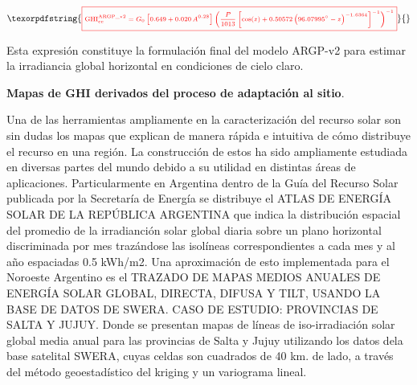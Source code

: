 \documentclass[letterpaper,12pt, twoside]{report}
\makeatletter
\let\newtitle\@title
\providecommand{\DIFdeltex}[1]{{\protect\color{red} \scriptsize #1}} %
\providecommand{\DIFaddbegin}{} %
\providecommand{\DIFaddend}{} %
\providecommand{\DIFdelbegin}{} %
\providecommand{\DIFdelend}{} %
\providecommand{\DIFdel}[1]{\texorpdfstring{\DIFdeltex{#1}}{}} %
\newcommand{\DIFscaledelfig}{0.5}
\newlength{\DIFdelgraphicswidth} %
\newlength{\DIFdelgraphicsheight} %
\newcommand{\DIFaddincludegraphics}[2][]{{\color{blue}\fbox{\DIFOincludegraphics[#1]{#2}}}} %
\newcommand{\DIFdelincludegraphics}[2][]{%
\sbox{\DIFdelgraphicsbox}{\DIFOincludegraphics[#1]{#2}}%
\settoboxwidth{\DIFdelgraphicswidth}{\DIFdelgraphicsbox} %
\settoboxtotalheight{\DIFdelgraphicsheight}{\DIFdelgraphicsbox} %
\scalebox{\DIFscaledelfig}{%
\parbox[b]{\DIFdelgraphicswidth}{\usebox{\DIFdelgraphicsbox}\\[-\baselineskip] \rule{\DIFdelgraphicswidth}{0em}}\llap{\resizebox{\DIFdelgraphicswidth}{\DIFdelgraphicsheight}{%
\setlength{\unitlength}{\DIFdelgraphicswidth}%
\begin{picture}(1,1)%
\thicklines\linethickness{2pt} %
{\color[rgb]{1,0,0}\put(0,0){\framebox(1,1){}}}%
{\color[rgb]{1,0,0}\put(0,0){\line( 1,1){1}}}%
{\color[rgb]{1,0,0}\put(0,1){\line(1,-1){1}}}%
\end{picture}%
}\hspace*{3pt}}} %
} %
\DeclareRobustCommand{\DIFaddbegin}{\DIFOaddbegin \let\includegraphics\DIFaddincludegraphics} %
\DeclareRobustCommand{\DIFaddend}{\DIFOaddend \let\includegraphics\DIFOincludegraphics} %
\DeclareRobustCommand{\DIFdelbegin}{\DIFOdelbegin \let\includegraphics\DIFdelincludegraphics} %
\DeclareRobustCommand{\DIFdelend}{\DIFOaddend \let\includegraphics\DIFOincludegraphics} %
\makeatother
\begin{document}
\begin{displaymath}
\DIFdel{\boxed{
\mathrm{GHI_{cc}^{ARGP\_v2}} =
G_0 \left[ 0.649 + 0.020\, A^{0.28} \right]
\left(
\frac{P}{1013}
\left[
\cos(z) + 0.50572 \left( 96.07995^\circ - z \right)^{-1.6364}
\right]^{-1}
\right)^{-1}
}
\label{eq:argpv2_final}
}\end{displaymath}%

\DIFdel{Esta expresión constituye la formulación final del modelo ARGP-v2 para estimar la irradiancia 
global horizontal en condiciones de cielo claro.
}%

\DIFdelend \DIFaddbegin  \DIFaddend %
\DIFdelbegin %
\addcontentsline{toc}{chapter}{\DIFdel{\textbf{Anexo 2}}} 


\DIFdel{\textbf{Mapas de GHI derivados del proceso de adaptación al sitio}.
}%

\DIFdel{Una de las herramientas ampliamente en la caracterización del recurso solar son sin dudas los mapas que explican de manera rápida e intuitiva de cómo distribuye el recurso en una región. La construcción de estos ha sido ampliamente estudiada en diversas partes del mundo debido a su utilidad en distintas áreas de aplicaciones. Particularmente en Argentina dentro de la Guía del Recurso Solar publicada por la Secretaría de Energía se distribuye el ATLAS DE ENERGÍA SOLAR DE LA REPÚBLICA ARGENTINA que indica la distribución espacial del promedio de la irradianción solar global diaria sobre un plano horizontal discriminada por mes trazándose las isolíneas correspondientes a cada mes y al año
espaciadas 0.5 kWh/m2. Una aproximación de esto implementada para el Noroeste Argentino es el TRAZADO DE MAPAS MEDIOS ANUALES DE ENERGÍA SOLAR GLOBAL, DIRECTA, DIFUSA Y TILT, USANDO LA BASE DE DATOS DE SWERA. CASO DE ESTUDIO: PROVINCIAS DE SALTA Y JUJUY. Donde se presentan mapas de líneas de iso-irradiación solar global media anual para las provincias de Salta y Jujuy utilizando los datos dela base satelital SWERA, cuyas celdas son cuadrados de 40 km. de lado, a través del método geoestadístico del kriging y un variograma lineal. 
}%
\end{document}
